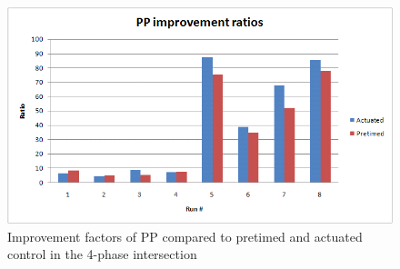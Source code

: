 \documentclass [a4paper, 10pt]{article}
\begin{document}
\begin{figure}[!ht]
\begin{center}
\includegraphics[scale=0.35]{phase-by-phase_improvement_ratios.png} 
\end{center}
\caption{Improvement factors of PP compared to pretimed and actuated control in the 4-phase intersection}
\label{fig:pp_improvements}
\end{figure}
\end{document}
